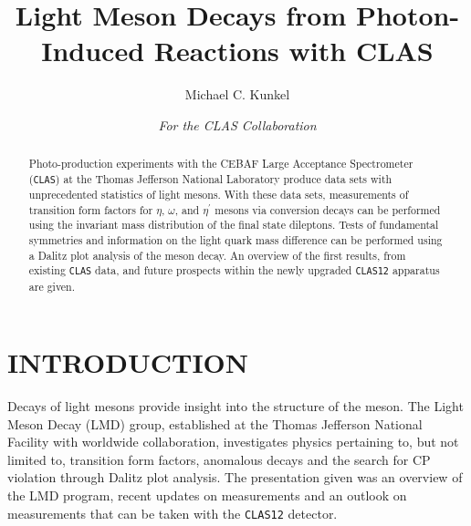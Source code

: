 \documentclass{aip-cp}
\begin{document}
\title{Light Meson Decays from Photon-Induced Reactions with CLAS}

\author[aff1]{Michael C. Kunkel}
\author{\textit{For the CLAS Collaboration}}
\maketitle

\begin{abstract}
Photo-production experiments with the CEBAF Large Acceptance Spectrometer (\textsc{\texttt{CLAS}}) at the Thomas Jefferson National Laboratory produce data sets with unprecedented statistics of light mesons. With these data sets, measurements of transition form factors for $\eta$, $\omega$, and $\eta^\prime$ mesons via conversion decays can be performed using the invariant mass distribution of the final state dileptons. Tests of fundamental symmetries and information on the light quark mass difference can be performed using a Dalitz plot analysis of the meson decay. An overview of the first results, from existing \textsc{\texttt{CLAS}} data, and future prospects within the newly upgraded \textsc{\texttt{CLAS12}} apparatus are given.
\end{abstract}

\section{INTRODUCTION}
Decays of light mesons provide insight into the structure of the meson. The Light Meson Decay (LMD) group, established at the Thomas Jefferson National Facility with worldwide collaboration, investigates physics pertaining to, but not limited to, transition form factors, anomalous decays and the search for CP violation through Dalitz plot analysis. The presentation given was an overview of the LMD program, recent updates on measurements and an outlook on measurements that can be taken with the \textsc{\texttt{CLAS12}} detector. 
\end{document}
